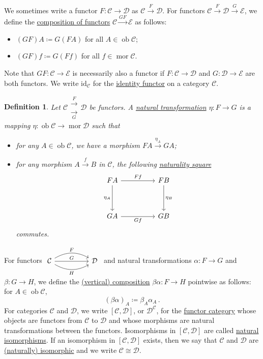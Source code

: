 \documentclass[a4paper,11pt]{article}
\theoremstyle{break_italics}
\newtheorem*{definition*}{Definition}
\theoremstyle{break_upright}
\theoremstyle{remark}
\newcommand{\id}{\mathrm{id}}
\newcommand{\ob}{\operatorname{ob}}
\newcommand{\mor}{\operatorname{mor}}
\newcommand{\C}{\mathcal{C}}
\newcommand{\D}{\mathcal{D}}
\begin{document}
We sometimes write a functor $F \colon \C \to \D$ as $\C \xrightarrow{F} \D$. For functors $\C \xrightarrow{F} \D \xrightarrow{G} \mathcal E$, we define the \uline{composition of functors} $\C \xrightarrow{GF} \mathcal E$ as follows:
\begin{itemize}
	\item $(GF)A \coloneqq G(FA)$ for all $A \in \ob\C$;
	\item $(GF)f \coloneqq G(Ff)$ for all $f \in \mor\C$.
\end{itemize}
Note that $GF \colon \C \to \mathcal E$ is necessarily also a functor if $F \colon \C \to \D$ and $G \colon \D \to \mathcal E$ are both functors. We write $\id_\C$ for the \uline{identity functor} on a category $\C$.

\begin{definition*}
Let $\C \substack{\xrightarrow{F} \\ \xrightarrow[G]{}} \D$ be functors. A \uline{natural transformation} $\eta \colon F \to G$ is a mapping $\eta \colon \ob\C \to \mor\D$ such that
\begin{itemize}
	\item for any $A \in \ob\C$, we have a morphism $FA \xrightarrow{\eta_A} GA$;
	\item for any morphism $A \xrightarrow{f} B$ in $\C$, the following \uline{naturality square}
		\[
\begin{tikzcd}
FA \arrow[rr, "Ff"] \arrow[dd, "\eta_A"'] &  & FB \arrow[dd, "\eta_B"] \\
                                          &  &                         \\
GA \arrow[rr, "Gf"']                      &  & GB                     
\end{tikzcd}
		\]
		commutes.
\end{itemize}
\end{definition*}

For functors $\begin{tikzcd}
\C \arrow[rr, "G"] \arrow[rr, "F", bend left] \arrow[rr, "H"', bend right] &  & \D
\end{tikzcd}$ and natural transformations $\alpha \colon F \to G$ and $\beta \colon G \to H$, we define the \uline{(vertical) composition} $\beta\alpha \colon F \to H$ pointwise as follows: for $A \in \ob\C$, 
\[
	(\beta\alpha)_A \coloneqq \beta_A\alpha_A\,.
\]
For categories $\C$ and $\D$, we write $[\C,\D]$, or $\D^\C$, for the \uline{functor category} whose objects are functors from $\C$ to $\D$ and whose morphisms are natural transformations between the functors. Isomorphisms in $[\C,\D]$ are called \uline{natural isomorphisms}. If an isomorphism in $[\C,\D]$ exists, then we say that $\C$ and $\D$ are \uline{(naturally) isomorphic} and we write $\C \cong \D$.
\end{document}

